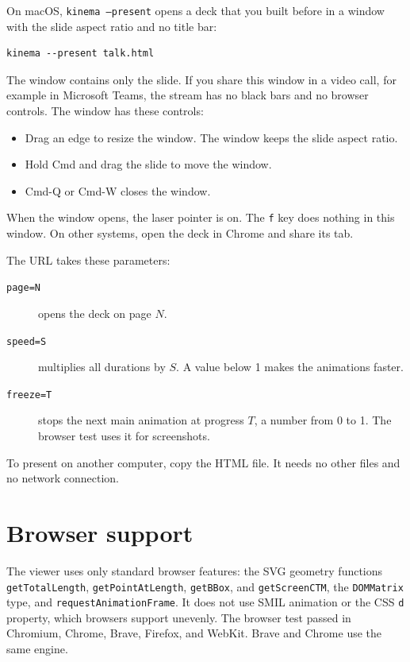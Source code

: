 \documentclass[11pt]{article}
\newcommand{\cmd}[1]{\texttt{#1}}
\begin{document}
On macOS, \cmd{kinema --present} opens a deck that you built before in a window
with the slide aspect ratio and no title bar:
\begin{lstlisting}
kinema --present talk.html
\end{lstlisting}
The window contains only the slide. If you share this window in a video call, for
example in Microsoft Teams, the stream has no black bars and no browser controls.
The window has these controls:
\begin{itemize}
	\item Drag an edge to resize the window. The window keeps the slide aspect
	      ratio.
	\item Hold Cmd and drag the slide to move the window.
	\item Cmd-Q or Cmd-W closes the window.
\end{itemize}
When the window opens, the laser pointer is on. The \cmd{f} key does nothing in
this window. On other systems, open the deck in Chrome and share its tab.

The URL takes these parameters:
\begin{description}
	\item[\cmd{page=N}] opens the deck on page $N$.
	\item[\cmd{speed=S}] multiplies all durations by $S$. A value below 1 makes the
	      animations faster.
	\item[\cmd{freeze=T}] stops the next main animation at progress $T$, a number
	      from 0 to 1. The browser test uses it for screenshots.
\end{description}

To present on another computer, copy the HTML file. It needs no other files and
no network connection.

\section{Browser support}

\begin{sloppypar}
	The viewer uses only standard browser features: the SVG geometry functions
	\cmd{getTotalLength}, \cmd{getPointAtLength}, \cmd{getBBox}, and
	\cmd{getScreenCTM}, the \cmd{DOMMatrix} type, and \cmd{requestAnimationFrame}. It
	does not use SMIL animation or the CSS \cmd{d} property, which browsers support
	unevenly. The browser test passed in Chromium, Chrome, Brave, Firefox, and WebKit.
	Brave and Chrome use the same engine.
\end{sloppypar}
\end{document}
